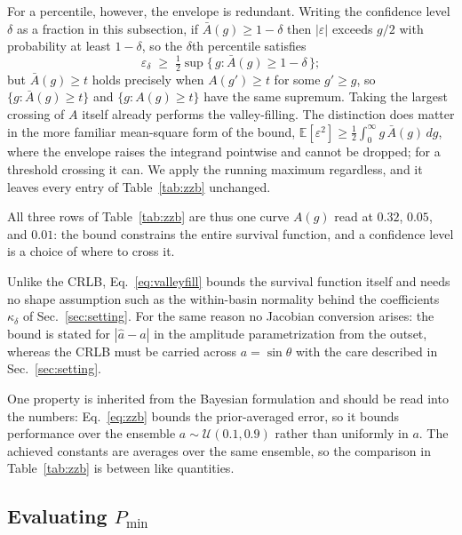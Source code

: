 \documentclass[%
 twocolumn,
 amsmath,amssymb,
prx,
longbibliography
]{revtex4-2}
\begin{document}
For a percentile, however, the envelope is redundant. Writing the confidence level $\delta$ as a fraction in this subsection, if $\bar A(g) \ge 1 - \delta$ then $|\varepsilon|$ exceeds $g/2$ with probability at least $1-\delta$, so the $\delta$th percentile satisfies
\begin{equation}\label{eq:zzbpct}
    \varepsilon_\delta \;\ge\; \tfrac12 \sup\big\{\, g : \bar A(g) \ge 1 - \delta \,\big\} ;
\end{equation}
but $\bar A(g) \ge t$ holds precisely when $A(g') \ge t$ for some $g' \ge g$, so $\{g : \bar A(g) \ge t\}$ and $\{g : A(g) \ge t\}$ have the same supremum. Taking the largest crossing of $A$ itself already performs the valley-filling. The distinction does matter in the more familiar mean-square form of the bound, $\mathbb{E}[\varepsilon^2] \ge \tfrac12\int_0^\infty g\,\bar A(g)\,dg$, where the envelope raises the integrand pointwise and cannot be dropped; for a threshold crossing it can. We apply the running maximum regardless, and it leaves every entry of Table~\ref{tab:zzb} unchanged.

All three rows of Table~\ref{tab:zzb} are thus one curve $A(g)$ read at $0.32$, $0.05$, and $0.01$: the bound constrains the entire survival function, and a confidence level is a choice of where to cross it.

Unlike the \ac{CRLB}, Eq.~\eqref{eq:valleyfill} bounds the survival function itself and needs no shape assumption such as the within-basin normality behind the coefficients $\kappa_\delta$ of Sec.~\ref{sec:setting}. For the same reason no Jacobian conversion arises: the bound is stated for $|\hat a - a|$ in the amplitude parametrization from the outset, whereas the \ac{CRLB} must be carried across $a = \sin\theta$ with the care described in Sec.~\ref{sec:setting}.

One property is inherited from the Bayesian formulation and should be read into the numbers: Eq.~\eqref{eq:zzb} bounds the prior-averaged error, so it bounds performance over the ensemble $a \sim \mathcal{U}(0.1, 0.9)$ rather than uniformly in $a$. The achieved constants are averages over the same ensemble, so the comparison in Table~\ref{tab:zzb} is between like quantities.

\subsection{\texorpdfstring{Evaluating $P_{\min}$}{Evaluating Pmin}}\label{app:zzb:pmin}
\end{document}
